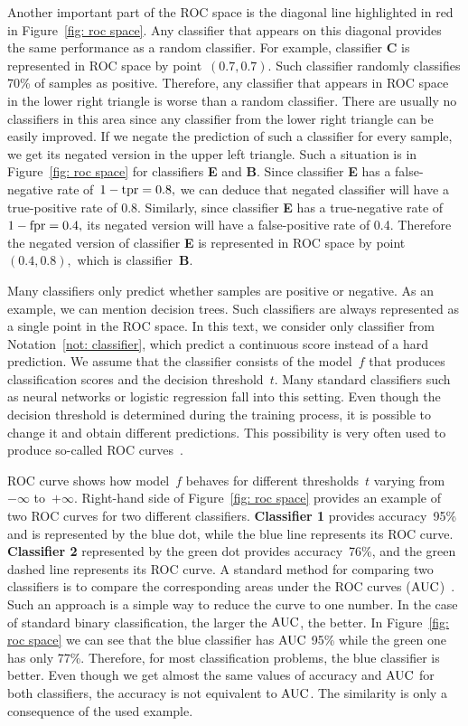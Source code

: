 Another important part of the ROC space is the diagonal line highlighted in red in Figure~\ref{fig: roc space}. Any classifier that appears on this diagonal provides the same performance as a random classifier. For example, classifier \textbf{C} is represented in ROC space by point~$(0.7, 0.7).$ Such classifier randomly classifies 70\% of samples as positive. Therefore, any classifier that appears in ROC space in the lower right triangle is worse than a random classifier. There are usually no classifiers in this area since any classifier from the lower right triangle can be easily improved. If we negate the prediction of such a classifier for every sample, we get its negated version in the upper left triangle. Such a situation is in Figure~\ref{fig: roc space} for classifiers \textbf{E} and \textbf{B}. Since classifier \textbf{E} has a false-negative rate of~$1 - \operatorname{tpr} = 0.8,$ we can deduce that negated classifier will have a true-positive rate of 0.8. Similarly, since classifier \textbf{E} has a true-negative rate of $1 - \operatorname{fpr} = 0.4,$ its negated version will have a false-positive rate of 0.4. Therefore the negated version of classifier \textbf{E} is represented in ROC space by point~$(0.4, 0.8),$ which is classifier~\textbf{B}.

Many classifiers only predict whether samples are positive or negative. As an example, we can mention decision trees. Such classifiers are always represented as a single point in the ROC space. In this text, we consider only classifier from Notation~\ref{not: classifier}, which predict a continuous score instead of a hard prediction. We assume that the classifier consists of the model~$f$ that produces classification scores and the decision threshold~$t.$ Many standard classifiers such as neural networks or logistic regression fall into this setting. Even though the decision threshold is determined during the training process, it is possible to change it and obtain different predictions. This possibility is very often used to produce so-called ROC curves~\cite{fawcett2006introduction}.

ROC curve shows how model~$f$ behaves for different thresholds~$t$ varying from~$-\infty$ to~$+\infty.$ Right-hand side of Figure~\ref{fig: roc space} provides an example of two ROC curves for two different classifiers. \textbf{Classifier 1} provides accuracy~95\% and is represented by the blue dot, while the blue line represents its ROC curve. \textbf{Classifier 2} represented by the green dot provides accuracy~76\%, and the green dashed line represents its ROC curve. A standard method for comparing two classifiers is to compare the corresponding areas under the ROC curves ($\operatorname{AUC}$)~\cite{bradley1997use, hanley1982meaning}. Such an approach is a simple way to reduce the curve to one number. In the case of standard binary classification, the larger the $\operatorname{AUC}$, the better. In Figure~\ref{fig: roc space} we can see that the blue classifier has $\operatorname{AUC}$ 95\% while the green one has only 77\%. Therefore, for most classification problems, the blue classifier is better. Even though we get almost the same values of accuracy and $\operatorname{AUC}$ for both classifiers, the accuracy is not equivalent to $\operatorname{AUC}$. The similarity is only a consequence of the used example.

